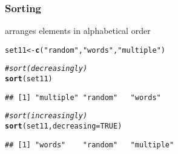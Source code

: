 \documentclass[12pt]{beamer}\usepackage[]{graphicx}\usepackage[]{color}
\makeatletter
\newcommand{\hlnum}[1]{\textcolor[rgb]{0.686,0.059,0.569}{#1}}%
\newcommand{\hlstr}[1]{\textcolor[rgb]{0.192,0.494,0.8}{#1}}%
\newcommand{\hlcom}[1]{\textcolor[rgb]{0.678,0.584,0.686}{\textit{#1}}}%
\newcommand{\hlstd}[1]{\textcolor[rgb]{0.345,0.345,0.345}{#1}}%
\newcommand{\hlkwb}[1]{\textcolor[rgb]{0.69,0.353,0.396}{#1}}%
\newcommand{\hlkwc}[1]{\textcolor[rgb]{0.333,0.667,0.333}{#1}}%
\newcommand{\hlkwd}[1]{\textcolor[rgb]{0.737,0.353,0.396}{\textbf{#1}}}%
\newenvironment{kframe}{%
 \def\at@end@of@kframe{}%
 \ifinner\ifhmode%
  \def\at@end@of@kframe{\end{minipage}}%
  \begin{minipage}{\columnwidth}%
 \fi\fi%
 \def\FrameCommand##1{\hskip\@totalleftmargin \hskip-\fboxsep
 \colorbox{shadecolor}{##1}\hskip-\fboxsep
     \hskip-\linewidth \hskip-\@totalleftmargin \hskip\columnwidth}%
 \MakeFramed {\advance\hsize-\width
   \@totalleftmargin\z@ \linewidth\hsize
   \@setminipage}}%
 {\par\unskip\endMakeFramed%
 \at@end@of@kframe}
\newenvironment{knitrout}{}{} %
\makeatother
\begin{document}

\begin{frame}[fragile]
\frametitle{Sorting}

 arranges elements in alphabetical order
\begin{knitrout}\footnotesize
{}\color{fgcolor}\begin{kframe}
\begin{alltt}
\hlstd{set11} \hlkwb{<-} \hlkwd{c}\hlstd{(}\hlstr{"random"}\hlstd{,} \hlstr{"words"}\hlstd{,} \hlstr{"multiple"}\hlstd{)}

\hlcom{# sort (decreasingly)}
\hlkwd{sort}\hlstd{(set11)}
\end{alltt}
\begin{verbatim}
## [1] "multiple" "random"   "words"
\end{verbatim}
\begin{alltt}
\hlcom{# sort (increasingly)}
\hlkwd{sort}\hlstd{(set11,} \hlkwc{decreasing} \hlstd{=} \hlnum{TRUE}\hlstd{)}
\end{alltt}
\begin{verbatim}
## [1] "words"    "random"   "multiple"
\end{verbatim}
\end{kframe}
\end{knitrout}

\end{frame}

\end{document}
